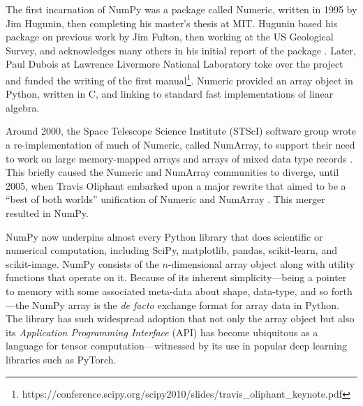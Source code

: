 The first incarnation of NumPy was a package called Numeric, written in 1995
by Jim Hugunin, then completing his master's thesis at MIT.
Hugunin based his package on previous work by Jim Fulton,
then working at the US Geological Survey, and acknowledges
many others in his initial report of the package \cite{Hugunin-whitepaper}.
Later, Paul Dubois at Lawrence Livermore National Laboratory toke over the project
and funded the writing of the first
manual\footnote{https://conference.scipy.org/scipy2010/slides/travis\_oliphant\_keynote.pdf}.
Numeric provided an array object in Python, written in C, and linking to
standard fast implementations of linear algebra.

Around 2000, the Space Telescope Science Institute (STScI) software group wrote
a re-implementation of much of Numeric, called NumArray, to support their
need to work on large memory-mapped arrays and arrays of mixed data type
records \cite{STScI-slither}.
This briefly caused the Numeric and NumArray communities to diverge, until 2005,
when Travis Oliphant embarked upon a major rewrite that aimed to be a ``best of
both worlds'' unification of Numeric and NumArray \cite{oliphant2006guide}.
This merger resulted in NumPy.

NumPy now underpins almost every Python library that does scientific or
numerical computation, including SciPy\cite{virtanen2019scipy},
matplotlib\cite{hunter2007matplotlib}, pandas\cite{mckinney-proc-scipy-2010},
scikit-learn\cite{pedregosa2011scikit}, and
scikit-image\cite{vanderwalt2014scikit}.
NumPy consists of the $n$-dimensional array object along with utility functions
that operate on it.
Because of its inherent simplicity---being a pointer to memory with some
associated meta-data about shape, data-type, and so forth---the NumPy array is
the {\it de facto} exchange format for array data in Python.
The library has such widespread adoption that not only the array object but also its
{\it Application Programming Interface} (API) has become ubiquitous as
a language for tensor computation---witnessed by its use in popular
deep learning libraries such as PyTorch\cite{pytorch}.

